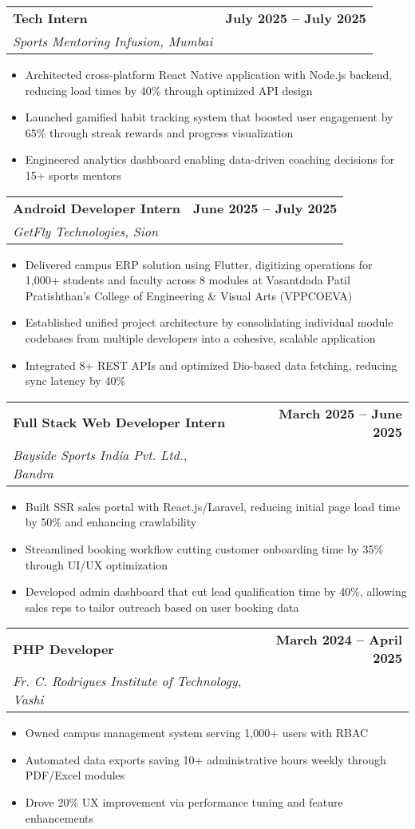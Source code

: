 \documentclass[10pt,a4paper]{article}
\makeatletter
\newcommand{\resumeItem}[1]{\item\small{#1}}
\newcommand{\resumeSubheading}[4]{
  \vspace{-1pt}
  \begin{tabular*}{\textwidth}[t]{l@{\extracolsep{\fill}}r}
    \textbf{#1} & \textcolor{light}{\small\textbf{#2}} \\
    \textit{\small#3} & \textcolor{light}{\small#4} \\
  \end{tabular*}\vspace{-5pt}
}
\makeatother
\begin{document}
\vspace{0.1em}

\resumeSubheading
{Tech Intern}{July 2025 -- July 2025}
{Sports Mentoring Infusion, Mumbai}{}
\begin{itemize}
    \resumeItem{Architected cross-platform React Native application with Node.js backend, reducing load times by 40\% through optimized API design}
    \resumeItem{Launched gamified habit tracking system that boosted user engagement by 65\% through streak rewards and progress visualization}
    \resumeItem{Engineered analytics dashboard enabling data-driven coaching decisions for 15+ sports mentors}
\end{itemize}

\vspace{0.1em}

\resumeSubheading
{Android Developer Intern}{June 2025 -- July 2025}
{GetFly Technologies, Sion}{}
\begin{itemize}
    \resumeItem{Delivered campus ERP solution using Flutter, digitizing operations for 1,000+ students and faculty across 8 modules at Vasantdada Patil Pratishthan’s College of Engineering \& Visual Arts (VPPCOEVA)}
\resumeItem{Established unified project architecture by consolidating individual module codebases from multiple developers into a cohesive, scalable application}
\resumeItem{Integrated 8+ REST APIs and optimized Dio-based data fetching, reducing sync latency by 40\%}

\end{itemize}

\vspace{0.1em}

\resumeSubheading
{Full Stack Web Developer Intern}{March 2025 -- June 2025}
{Bayside Sports India Pvt. Ltd., Bandra}{}
\begin{itemize}
    \resumeItem{Built SSR sales portal with React.js/Laravel, reducing initial page load time by 50\% and enhancing crawlability}
    \resumeItem{Streamlined booking workflow cutting customer onboarding time by 35\% through UI/UX optimization}
    \resumeItem{Developed admin dashboard that cut lead qualification time by 40\%, allowing sales reps to tailor outreach based on user booking data}
\end{itemize}

\vspace{0.1em}

\resumeSubheading
{PHP Developer}{March 2024 -- April 2025}  
{Fr. C. Rodrigues Institute of Technology, Vashi}{}
\begin{itemize}
    \resumeItem{Owned campus management system serving 1,000+ users with RBAC}
    \resumeItem{Automated data exports saving 10+ administrative hours weekly through PDF/Excel modules}
    \resumeItem{Drove 20\% UX improvement via performance tuning and feature enhancements}
\end{itemize}
\end{document}
